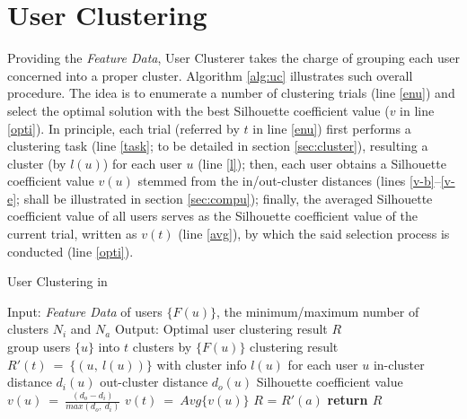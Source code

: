 \section{User Clustering}
\label{sec:uc}


Providing the \textit{Feature Data}, User Clusterer takes the charge of grouping each user concerned into a proper cluster.
Algorithm \ref{alg:uc} illustrates such overall procedure.
%
The idea is to enumerate a number of clustering trials (line \ref{enu}) and select the optimal solution with the best Silhouette coefficient value ($v$ in line \ref{opti}).
In principle, each trial (referred by $t$ in line \ref{enu}) first performs a clustering task (line \ref{task}; to be detailed in section \ref{sec:cluster}), resulting a cluster (by $l(u)$) for each user $u$ (line \ref{l});
then, each user obtains a Silhouette coefficient value $v(u)$ stemmed from the in/out-cluster distances (lines \ref{v-b}--\ref{v-e}; shall be illustrated in section \ref{sec:compu});
finally, the averaged Silhouette coefficient value of all users serves as the Silhouette coefficient value of the current trial, written as $v(t)$ (line \ref{avg}), by which the said selection process is conducted (line \ref{opti}).


\begin{algorithm}[t]
\begin{small}
\caption{User Clustering in \sys{}}
\label{alg:uc}

\begin{algorithmic}[1]
\State Input: \textit{Feature Data} of users $\{F(u)\}$, the minimum/maximum number of clusters $N_i$ and $N_a$
\State Output: Optimal user clustering result $R$
\\
 \label{enu}
	\State group users $\{u\}$ into $t$ clusters by $\{F(u)\}$ \label{task}
	\State clustering result $R'(t)\ =\ \{(u,\ l(u))\}$ with cluster info $l(u)$ for each user $u$ \label{l}
		\State in-cluster distance $d_i(u)$ \label{v-b}
		\State out-cluster distance $d_o(u)$
		\State Silhouette coefficient value $v(u)\ =\ \frac{(d_o - d_i)}{max(d_o,\ d_i)}$ \label{v-e}
	\EndFor
	\State $v(t)\ =\ Avg\{v(u)\}$ \label{avg}
\EndFor
{} \label{opti}
	\State $R$ = $R'(a)$
\EndIf
\State \bfseries{return} $R$
\end{algorithmic}
\end{small}
\end{algorithm}

